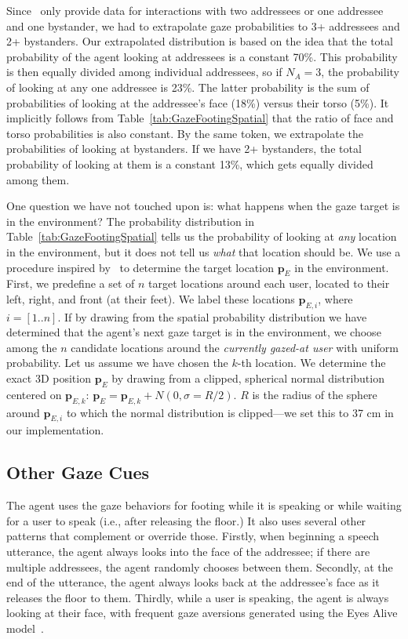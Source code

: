 Since~\citet{mutlu2012conversational} only provide data for interactions with two addressees or one addressee and one bystander, we had to extrapolate gaze probabilities to 3+ addressees and 2+ bystanders. Our extrapolated distribution is based on the idea that the total probability of the agent looking at addressees is a constant 70\%. This probability is then equally divided among individual addressees, so if $N_A = 3$, the probability of looking at any one addressee is 23\%. The latter probability is the sum of probabilities of looking at the addressee's face (18\%) versus their torso (5\%). It implicitly follows from Table~\ref{tab:GazeFootingSpatial} that the ratio of face and torso probabilities is also constant. By the same token, we extrapolate the probabilities of looking at bystanders. If we have 2+ bystanders, the total probability of looking at them is a constant 13\%, which gets equally divided among them.

One question we have not touched upon is: what happens when the gaze target is in the environment? The probability distribution in Table~\ref{tab:GazeFootingSpatial} tells us the probability of looking at \emph{any} location in the environment, but it does not tell us \emph{what} that location should be. We use a procedure inspired by~\citet{mutlu2012conversational} to determine the target location $\mathbf{p}_E$ in the environment. First, we predefine a set of $n$ target locations around each user, located to their left, right, and front (at their feet). We label these locations $\mathbf{p}_{E,i}$, where $i = [1..n]$. If by drawing from the spatial probability distribution we have determined that the agent's next gaze target is in the environment, we choose among the $n$ candidate locations around the \emph{currently gazed-at user} with uniform probability. Let us assume we have chosen the $k$-th location. We determine the exact 3D position $\mathbf{p}_E$ by drawing from a clipped, spherical normal distribution centered on $\mathbf{p}_{E,k}$: $\mathbf{p}_E = \mathbf{p}_{E,k} + N(0, \sigma = R/2)$. $R$ is the radius of the sphere around $\mathbf{p}_{E,i}$ to which the normal distribution is clipped---we set this to 37 cm in our implementation.

\subsection{Other Gaze Cues}

The agent uses the gaze behaviors for footing while it is speaking or while waiting for a user to speak (i.e., after releasing the floor.) It also uses several other patterns that complement or override those. Firstly, when beginning a speech utterance, the agent always looks into the face of the addressee; if there are multiple addressees, the agent randomly chooses between them. Secondly, at the end of the utterance, the agent always looks back at the addressee's face as it releases the floor to them. Thirdly, while a user is speaking, the agent is always looking at their face, with frequent gaze aversions generated using the Eyes Alive model~\citep{lee2002eyes}.